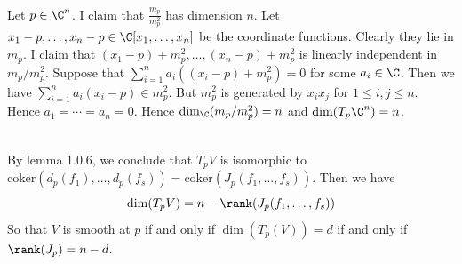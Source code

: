 \documentclass[a4paper]{article}
\begin{document}
\begin{ex}{}{}\\
Let $p\in\C^n$. I claim that $\frac{m_p}{m_p^2}$ has dimension $n$. Let $x_1-p,\dots,x_n-p\in\C[x_1,\dots,x_n]$ be the coordinate functions. Clearly they lie in $m_p$. I claim that $(x_1-p)+m_p^2,\dots,(x_n-p)+m_p^2$ is linearly independent in $m_p/m_p^2$. Suppose that $\sum_{i=1}^na_i((x_i-p)+m_p^2)=0$ for some $a_i\in\C$. Then we have $\sum_{i=1}^na_i(x_i-p)\in m_p^2$. But $m_p^2$ is generated by $x_ix_j$ for $1\leq i,j\leq n$. Hence $a_1=\cdots=a_n=0$. Hence $\dim_\C(m_p/m_p^2)=n$ and $\dim(T_p\C^n)=n$. 
\end{ex}

\begin{ex}{}{}\\
By lemma 1.0.6, we conclude that $T_pV$ is isomorphic to $\text{coker}(d_p(f_1),\dots,d_p(f_s))=\text{coker}(J_p(f_1,\dots,f_s))$. Then we have $$\dim(T_pV)=n-\rank(J_p(f_1,\dots,f_s))$$ So that $V$ is smooth at $p$ if and only if $\dim(T_p(V))=d$ if and only if $\rank(J_p)=n-d$. 
\end{ex}
\end{document}
